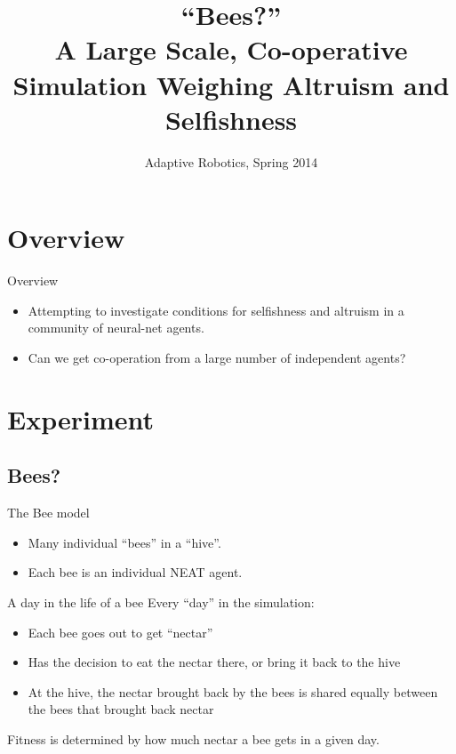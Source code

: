 \documentclass{beamer}
\title[Bees?]{``Bees?''\\ A Large Scale, Co-operative Simulation Weighing
                          Altruism and Selfishness}
\institute{Swarthmore College}
\date{Adaptive Robotics, Spring 2014}
\begin{document}
	\begin{frame}
		\titlepage
	\end{frame}

	\begin{frame}
		\tableofcontents
	\end{frame}

	\section{Overview}

	\begin{frame}{Overview}
		\begin{itemize}
			\item Attempting to investigate conditions for selfishness and altruism in a community of neural-net agents.
			\item Can we get co-operation from a large number of independent agents?
		\end{itemize}
	\end{frame}

	\section{Experiment}

	\subsection{Bees?}
	\begin{frame}{The Bee model}
		\begin{itemize}
			\item Many individual ``bees'' in a ``hive''.
			\item Each bee is an individual NEAT agent.
		\end{itemize}
	\end{frame}

	\begin{frame}{A day in the life of a bee}
		Every ``day'' in the simulation:
		\begin{itemize}
			\item Each bee goes out to get ``nectar''
			\item Has the decision to eat the nectar there, or bring it back to the hive
			\item At the hive, the nectar brought back by the bees is shared equally between the bees that brought back nectar
		\end{itemize}
		Fitness is determined by how much nectar a bee gets in a given day.
	\end{frame}
\end{document}
